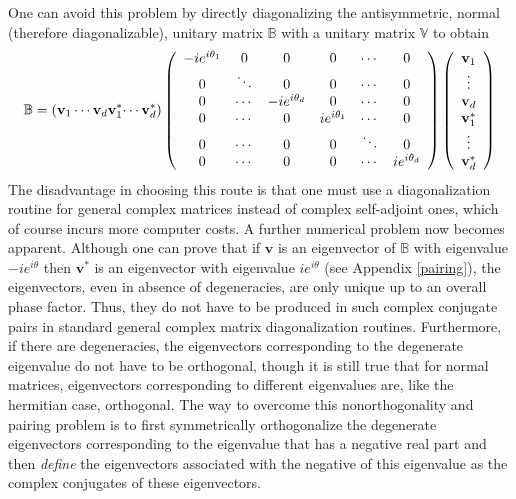 \documentclass[preprint,aps,showkeys]{revtex4}%
\begin{document}
One can avoid this problem by directly diagonalizing the antisymmetric, normal
\cite{Encyclo} (therefore diagonalizable), unitary matrix $\mathbb{B}$ with a
unitary matrix $\mathbb{V}$ to obtain
\begin{equation}
\mathbb{B}=\left(  \mathbf{v}_{1}\cdots\mathbf{v}_{d}\mathbf{v}_{1}^{\ast
}\mathbf{\cdots v}_{d}^{\ast}\right)  \left(
\begin{array}
[c]{cccccc}%
-ie^{i\theta_{1}} & 0 & 0 & 0 & \cdots & 0\\
0 & \ddots & 0 & 0 & \cdots & 0\\
0 & \cdots & -ie^{i\theta_{d}} & 0 & \cdots & 0\\
0 & \cdots & 0 & ie^{i\theta_{1}} & \cdots & 0\\
0 & \cdots & 0 & 0 & \ddots & 0\\
0 & \cdots & 0 & 0 & \cdots & ie^{i\theta_{d}}%
\end{array}
\right)  \left(
\begin{array}
[c]{c}%
\mathbf{v}_{1}\\
\vdots\\
\mathbf{v}_{d}\\
\mathbf{v}_{1}^{\ast}\\
\vdots\\
\mathbf{v}_{d}^{\ast}%
\end{array}
\right)
\end{equation}
The disadvantage in choosing this route is that one must use a diagonalization
routine for general complex matrices instead of complex self-adjoint ones,
which of course incurs more computer costs. A further numerical problem now
becomes apparent. Although one can prove that if $\mathbf{v}$ is an
eigenvector of $\mathbb{B}$ with eigenvalue $-ie^{i\theta}$ then
$\mathbf{v}^{\ast}$ is an eigenvector with eigenvalue $ie^{i\theta}$ (see
Appendix \ref{pairing}), the eigenvectors, even in absence of degeneracies,
are only unique up to an overall phase factor. Thus, they do not have to be
produced in such complex conjugate pairs in standard general complex matrix
diagonalization routines. Furthermore, if there are degeneracies, the
eigenvectors corresponding to the degenerate eigenvalue do not have to be
orthogonal, though it is still true that for normal matrices, eigenvectors
corresponding to different eigenvalues are, like the hermitian case,
orthogonal. The way to overcome this nonorthogonality and pairing problem is
to first symmetrically orthogonalize \cite{SymOrth} the degenerate
eigenvectors corresponding to the eigenvalue that has a negative real part and
then \emph{define }the eigenvectors associated with the negative of this
eigenvalue as the complex conjugates of these eigenvectors.
\end{document}
